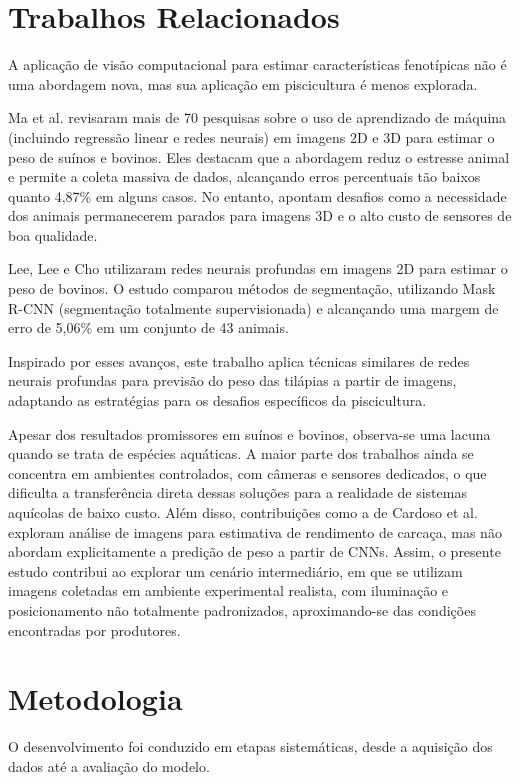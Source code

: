 \documentclass[sigconf,nonacm,screen]{acmart}
\begin{document}
\section{Trabalhos Relacionados}
A aplicação de visão computacional para estimar características fenotípicas não é uma abordagem nova, mas sua aplicação em piscicultura é menos explorada.

Ma et al. \cite{Ma2024} revisaram mais de 70 pesquisas sobre o uso de aprendizado de máquina (incluindo regressão linear e redes neurais) em imagens 2D e 3D para estimar o peso de suínos e bovinos. Eles destacam que a abordagem reduz o estresse animal e permite a coleta massiva de dados, alcançando erros percentuais tão baixos quanto 4,87\% em alguns casos. No entanto, apontam desafios como a necessidade dos animais permanecerem parados para imagens 3D e o alto custo de sensores de boa qualidade.

Lee, Lee e Cho \cite{Lee2023} utilizaram redes neurais profundas em imagens 2D para estimar o peso de bovinos. O estudo comparou métodos de segmentação, utilizando Mask R-CNN (segmentação totalmente supervisionada) e alcançando uma margem de erro de 5,06\% em um conjunto de 43 animais.

Inspirado por esses avanços, este trabalho aplica técnicas similares de redes neurais profundas para previsão do peso das tilápias a partir de imagens, adaptando as estratégias para os desafios específicos da piscicultura.

Apesar dos resultados promissores em suínos e bovinos, observa-se uma lacuna quando se trata de espécies aquáticas. A maior parte dos trabalhos ainda se concentra em ambientes controlados, com câmeras e sensores dedicados, o que dificulta a transferência direta dessas soluções para a realidade de sistemas aquícolas de baixo custo. Além disso, contribuições como a de Cardoso et al. \cite{Cardoso2021} exploram análise de imagens para estimativa de rendimento de carcaça, mas não abordam explicitamente a predição de peso a partir de CNNs. Assim, o presente estudo contribui ao explorar um cenário intermediário, em que se utilizam imagens coletadas em ambiente experimental realista, com iluminação e posicionamento não totalmente padronizados, aproximando-se das condições encontradas por produtores.

\section{Metodologia}
O desenvolvimento foi conduzido em etapas sistemáticas, desde a aquisição dos dados até a avaliação do modelo.
\end{document}
